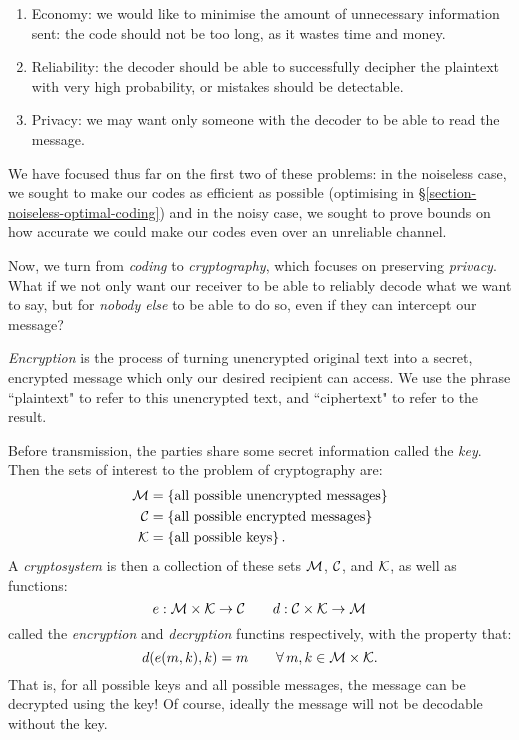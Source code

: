 \documentclass{article}
\begin{document}
\begin{enumerate}
    \item Economy: we would like to minimise the amount of unnecessary information sent: the code should not be too long, as it wastes time and money.
    \item Reliability: the decoder should be able to successfully decipher the plaintext with very high probability, or mistakes should be detectable.
    \item Privacy: we may want only someone with the decoder to be able to read the message.
\end{enumerate}

We have focused thus far on the first two of these problems: in the noiseless case, we sought to make our codes as efficient as possible (optimising in \S\ref{section-noiseless-optimal-coding}) and in the noisy case, we sought to prove bounds on how accurate we could make our codes even over an unreliable channel.

Now, we turn from \textit{coding} to \textit{cryptography}, which focuses on preserving \textit{privacy}. What if we not only want our receiver to be able to reliably decode what we want to say, but for \textit{nobody else} to be able to do so, even if they can intercept our message?

\begin{definition}[Cryptosystem]
	\label{cryptosystem}
	\textit{Encryption} is the process of turning unencrypted original text into a secret, encrypted message which only our desired recipient can access.
    We use the phrase ``plaintext" to refer to this unencrypted text, and ``ciphertext" to refer to the result.
    
    Before transmission, the parties share some secret information called the \textit{key}. Then the sets of interest to the problem of cryptography are:
    \begin{align*}
		\mathcal{M} &= \left\lbrace \text{all possible unencrypted messages} \right\rbrace \\
		\mathcal{C} &= \left\lbrace \text{all possible encrypted messages} \right\rbrace \\
		\mathcal{K} &= \left\lbrace \text{all possible keys} \right\rbrace.
	\end{align*}
    A \textit{cryptosystem} is then a collection of these sets $\mathcal{M}$, $\mathcal{C}$, and $\mathcal{K}$, as well as functions:
    \[
	e: \mathcal{M} \times \mathcal{K} \to \mathcal{C}
	\qquad
	d: \mathcal{C} \times \mathcal{K} \to \mathcal{M}
	\]
	called the \textit{encryption} and \textit{decryption} functins respectively, with the property that:
	\[
	d(e(m, k), k) = m \qquad \forall \, m,k \in \mathcal{M} \times \mathcal{K}.
	\]
	That is, for all possible keys and all possible messages, the message can be decrypted using the key! Of course, ideally the message will not be decodable without the key.
\end{definition}
\end{document}

